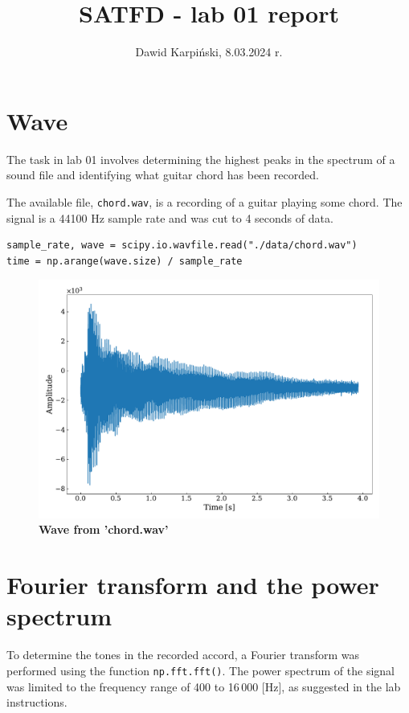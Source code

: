 \documentclass[13pt,a4paper]{article}
\begin{document}
\title{
    \LARGE
    \textbf{SATFD - lab 01 report}
}
\author{
    \large
    Dawid Karpiński, 8.03.2024 r.
}
\date{}
\maketitle

\section{Wave}

The task in lab 01 involves determining the highest peaks in the spectrum of a sound file and identifying what guitar chord has been recorded.

The available file, \verb|chord.wav|, is a recording of a guitar playing some chord. The signal is a 44100 Hz sample rate and was cut to 4 seconds of data.

\begin{lstlisting}
sample_rate, wave = scipy.io.wavfile.read("./data/chord.wav")
time = np.arange(wave.size) / sample_rate
\end{lstlisting}

\begin{figure}[ht!]
    \centering
    \caption{\textbf{Wave from 'chord.wav'}}
    \includegraphics[width=1\textwidth]{wave.pdf}
\end{figure}

\pagebreak
\section{Fourier transform and the power spectrum}

To determine the tones in the recorded accord, a Fourier transform was performed using the function \verb|np.fft.fft()|. The power spectrum of the signal was limited to the frequency range of 400 to 16\,000 [Hz], as suggested in the lab instructions.
\end{document}
